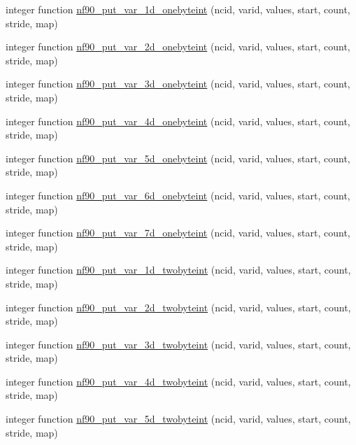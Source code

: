 \begin{DoxyCompactItemize}
\item 
integer function \hyperlink{netcdf__expanded_8f90_a4e9cd63e64bcc19bf2d40ab70c6606dd}{nf90\+\_\+put\+\_\+var\+\_\+1d\+\_\+onebyteint} (ncid, varid, values, start, count, stride, map)
\item 
integer function \hyperlink{netcdf__expanded_8f90_a53281f8feb61d247d7abff52eceef05e}{nf90\+\_\+put\+\_\+var\+\_\+2d\+\_\+onebyteint} (ncid, varid, values, start, count, stride, map)
\item 
integer function \hyperlink{netcdf__expanded_8f90_a96902a8b6f8705a9ae1e9f46aca673d9}{nf90\+\_\+put\+\_\+var\+\_\+3d\+\_\+onebyteint} (ncid, varid, values, start, count, stride, map)
\item 
integer function \hyperlink{netcdf__expanded_8f90_a87a4a103fcdd36b01a07268529c70dc8}{nf90\+\_\+put\+\_\+var\+\_\+4d\+\_\+onebyteint} (ncid, varid, values, start, count, stride, map)
\item 
integer function \hyperlink{netcdf__expanded_8f90_a8cde26b342930af72adbdbf4882f5a1b}{nf90\+\_\+put\+\_\+var\+\_\+5d\+\_\+onebyteint} (ncid, varid, values, start, count, stride, map)
\item 
integer function \hyperlink{netcdf__expanded_8f90_acbbb7508001e36e524a6f1798724d075}{nf90\+\_\+put\+\_\+var\+\_\+6d\+\_\+onebyteint} (ncid, varid, values, start, count, stride, map)
\item 
integer function \hyperlink{netcdf__expanded_8f90_a478211fe41a0dd55c0cfe0abe6f6a6d4}{nf90\+\_\+put\+\_\+var\+\_\+7d\+\_\+onebyteint} (ncid, varid, values, start, count, stride, map)
\item 
integer function \hyperlink{netcdf__expanded_8f90_a1a3b442e85f4db624d373f829961133a}{nf90\+\_\+put\+\_\+var\+\_\+1d\+\_\+twobyteint} (ncid, varid, values, start, count, stride, map)
\item 
integer function \hyperlink{netcdf__expanded_8f90_a1c5a0292a649ce8d1272ea15bf09f1ae}{nf90\+\_\+put\+\_\+var\+\_\+2d\+\_\+twobyteint} (ncid, varid, values, start, count, stride, map)
\item 
integer function \hyperlink{netcdf__expanded_8f90_a50f2e70929414fb8cefa3699bac3a4d9}{nf90\+\_\+put\+\_\+var\+\_\+3d\+\_\+twobyteint} (ncid, varid, values, start, count, stride, map)
\item 
integer function \hyperlink{netcdf__expanded_8f90_ad8cda8d14fae5709916706226de58236}{nf90\+\_\+put\+\_\+var\+\_\+4d\+\_\+twobyteint} (ncid, varid, values, start, count, stride, map)
\item 
integer function \hyperlink{netcdf__expanded_8f90_ac2a3ff05c9fb72ef179f4095859401ac}{nf90\+\_\+put\+\_\+var\+\_\+5d\+\_\+twobyteint} (ncid, varid, values, start, count, stride, map)

\end{DoxyCompactItemize}
